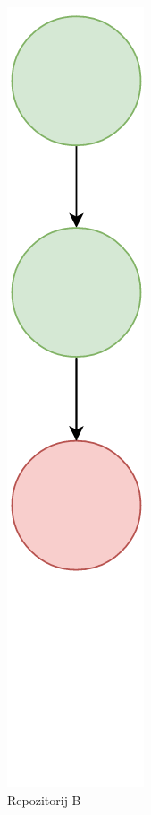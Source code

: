 \documentclass[times, utf8, diplomski, numeric]{fer}
\begin{document}
\begin{figure}[h!]
\begin{subfigure}{.24\textwidth}
\includegraphics[scale=0.4]{VersioningTreeC}
\caption{Repozitorij B}
\label{fig:VersioningTreeC}
\end{subfigure}
\begin{subfigure}{.24\textwidth}
\centering

\end{subfigure}
\end{figure}
\end{document}
